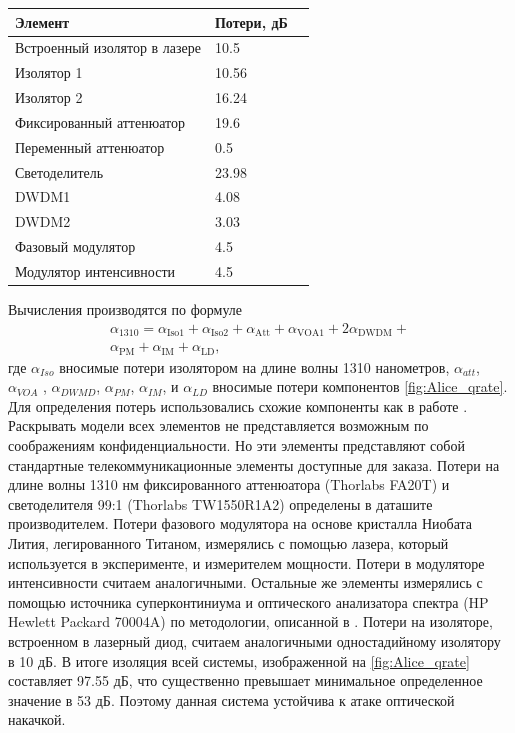 \begin{tabular}[t]{lll}
    \hline\hline
    Элемент & Потери, дБ  \\
    \hline
    Встроенный изолятор в лазере &10.5 \\
    Изолятор 1  & 10.56 &  \\
    Изолятор  2 & 16.24 &  \\
    Фиксированный аттенюатор & 19.6  \\
    Переменный аттенюатор & 0.5 \\
    Светоделитель & 23.98 \\
    DWDM1  & 4.08  \\
    DWDM2  & 3.03  \\
    Фазовый модулятор & 4.5  \\
    Модулятор интенсивности & 4.5 \\
    \hline\hline
    \end{tabular}
      \label{tab:isolation1310}

Вычисления производятся по формуле 
\begin{equation}
    \begin{split}
    \alpha_{1310}=\alpha_\text{Iso1} + \alpha_\text{Iso2} + \alpha_\text{Att} + \alpha_\text{VOA1} + 2\alpha_\text{DWDM} +\\
     \alpha_\text{PM} + \alpha_\text{IM} + \alpha_\text{LD},
     \end{split}
    \label{eq:input power}
\end{equation}
где $\alpha_{Iso}$ вносимые потери изолятором на длине волны 1310 нанометров, $\alpha_{att}$, $\alpha_{VOA}$ , $\alpha_{DWMD}$, $\alpha_{PM}$, $\alpha_{IM}$, и $\alpha_{LD}$ вносимые потери компонентов \ref{fig:Alice_qrate}.
Для определения потерь использовались схожие компоненты как в работе \cite{makarov2023}. Раскрывать модели всех элементов не представляется возможным по соображениям конфиденциальности. 
Но эти элементы представляют собой стандартные телекоммуникационные элементы доступные для заказа. Потери на длине волны 1310 нм фиксированного аттенюатора (Thorlabs FA20T) и светоделителя 99:1 (Thorlabs TW1550R1A2) определены в даташите производителем.
Потери фазового модулятора на основе кристалла Ниобата Лития, легированного Титаном, измерялись с помощью лазера, который используется в эксперименте, и измерителем мощности. Потери в модуляторе интенсивности считаем аналогичными.
Остальные же элементы измерялись с помощью источника суперконтиниума и оптического анализатора спектра (HP Hewlett Packard 70004A) по методологии, описанной в \cite{makarov2023}. Потери на изоляторе, встроенном в лазерный диод, считаем аналогичными одностадийному изолятору в 10 дБ.
В итоге изоляция всей системы, изображенной на \cref{fig:Alice_qrate} составляет 97.55 дБ, что существенно превышает минимальное определенное значение в 53 дБ. Поэтому данная система устойчива к атаке оптической накачкой. 


